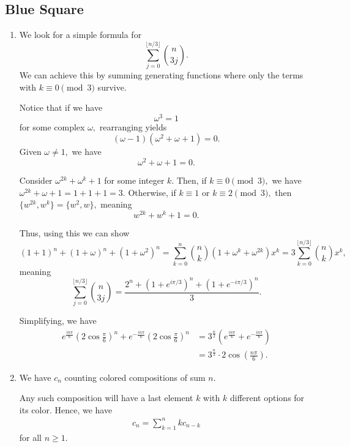 \documentclass[12pt]{article}
\begin{document}
\subsection{Blue Square}
\begin{enumerate}
  \item [7] We look for a simple formula for
    $$
    \sum_{j = 0}^{\lfloor n/3 \rfloor} {n \choose 3j}.
    $$
    We can achieve this by summing generating functions where only
    the terms with $k \equiv 0 \pmod 3$ survive.

    Notice that if we have
    $$
    \omega^3 = 1
    $$
    for some complex $\omega,$ rearranging yields
    $$
    (\omega - 1)(\omega^2 + \omega + 1) = 0.
    $$
    Given $\omega \neq 1,$ we have
    $$
    \omega^2 + \omega + 1 = 0.
    $$

    Consider $\omega^{2k} + \omega^k + 1$ for some integer $k.$ Then,
    if $k \equiv 0 \pmod 3,$ we have $\omega^{2k} + \omega + 1 = 1 +
    1 + 1 = 3.$ Otherwise, if $k \equiv 1$ or $k \equiv 2 \pmod 3,$
    then $\{w^{2k}, w^{k}\} = \{w^2, w\},$ meaning $$
    w^{2k} + w^{k} + 1 = 0.
    $$

    Thus, using this we can show
    $$
    (1 + 1)^n + (1 + \omega)^n + (1 + \omega^2)^n = \sum_{k = 0}^{n}
    {n \choose k} (1 + \omega^k + \omega^{2k})x^k = 3\sum_{k =
    0}^{\lfloor n/3 \rfloor } {n \choose k}x^k,
    $$
    meaning
    $$
    \sum_{j = 0}^{ \lfloor n/3 \rfloor} {n \choose 3j} = \dfrac{2^n +
    (1 + e^{i\pi/3})^n + (1 + e^{-i\pi/3})^n}{3}.
    $$

    Simplifying, we have
    \begin{align*}
      e^{\frac{in\pi}{6}}\left(2\cos\frac{\pi}{6}\right)^n +
      e^{-\frac{in\pi}{6}}\left(2\cos\frac{\pi}{6}\right)^n
      &= 3^{\frac{n}{2}}\left(e^{\frac{in\pi}{6}} +
      e^{-\frac{in\pi}{6}}\right) \\
      &= 3^{\frac{n}{2}} \cdot 2\cos\left(\frac{n\pi}{6}\right).
    \end{align*}

  \item [9] We have $c_n$ counting colored compositions of sum $n.$

    Any such composition will have a last element $k$ with $k$
    different options for its color. Hence, we have
    \begin{align*}
      c_n = \sum_{k = 1}^{n} k c_{n - k}
    \end{align*}
    for all $n \geq 1.$


\end{enumerate}
\end{document}
